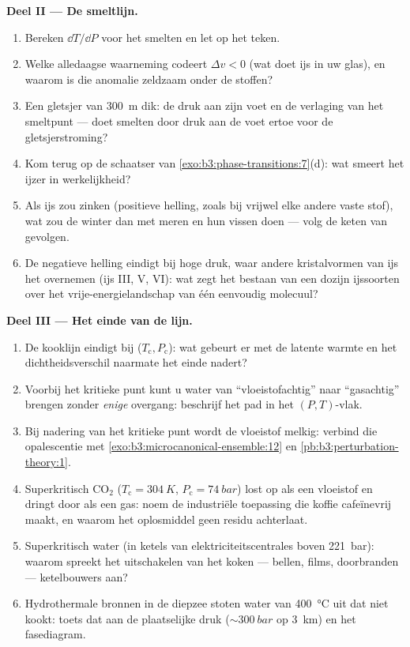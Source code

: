 \begin{problem}
\medskip\noindent\textbf{Deel II --- De smeltlijn.}
\begin{enumerate}[resume]
  \item Bereken $\dd T/\dd P$ voor het smelten en let op het teken.
  \item Welke alledaagse waarneming codeert $\Delta v < 0$ (wat
        doet ijs in uw glas), en waarom is die anomalie zeldzaam
        onder de stoffen?
  \item Een gletsjer van \qty{300}{m} dik: de druk aan zijn voet
        en de verlaging van het smeltpunt --- doet smelten door
        druk aan de voet ertoe voor de gletsjerstroming?
  \item Kom terug op de schaatser van
        \cref{exo:b3:phase-transitions:7}(d): wat smeert het
        ijzer in werkelijkheid?
  \item Als ijs zou zinken (positieve helling, zoals bij vrijwel elke
        andere vaste stof), wat zou de winter dan met meren en hun vissen
        doen --- volg de keten van gevolgen.
  \item De negatieve helling eindigt bij hoge druk, waar andere
        kristalvormen van ijs het overnemen (ijs III, V, VI): wat zegt het
        bestaan van een dozijn ijssoorten over het
        vrije-energielandschap van één eenvoudig molecuul?
\end{enumerate}

\medskip\noindent\textbf{Deel III --- Het einde van de lijn.}
\begin{enumerate}[resume]
  \item De kooklijn eindigt bij ($T_{\text{c}},
        P_{\text{c}}$): wat gebeurt er met de latente warmte en het
        dichtheidsverschil naarmate het einde nadert?
  \item Voorbij het kritieke punt kunt u water van
        ``vloeistofachtig'' naar ``gasachtig'' brengen zonder \emph{enige}
        overgang: beschrijf het pad in het $(P, T)$-vlak.
  \item Bij nadering van het kritieke punt wordt de vloeistof melkig:
        verbind die opalescentie met
        \cref{exo:b3:microcanonical-ensemble:12} en
        \cref{pb:b3:perturbation-theory:1}.
  \item Superkritisch CO$_2$ ($T_{\text{c}} = \qty{304}{K}$,
        $P_{\text{c}} = \qty{74}{bar}$) lost op als een vloeistof
        en dringt door als een gas: noem de industriële toepassing die
        koffie cafeïnevrij maakt, en waarom het oplosmiddel geen
        residu achterlaat.
  \item Superkritisch water (in ketels van elektriciteitscentrales boven
        \qty{221}{bar}): waarom spreekt het uitschakelen van het koken ---
        bellen, films, doorbranden --- ketelbouwers aan?
  \item Hydrothermale bronnen in de diepzee stoten water van
        \qty{400}{\celsius} uit dat niet kookt: toets dat aan de
        plaatselijke druk ($\sim\qty{300}{bar}$ op \qty{3}{km}) en
        het fasediagram.
\end{enumerate}


\end{problem}
